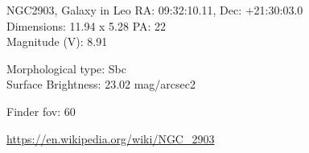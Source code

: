 \begin{block}{NGC2903, Galaxy in Leo}
    RA: 09:32:10.11, Dec: +21:30:03.0 \\ 
    Dimensions: 11.94 x 5.28 PA: 22 \\ 
    Magnitude (V): 8.91

    Morphological type: Sbc \\ 
    Surface Brightness: 23.02 mag/arcsec2 


    Finder fov: 60 

    \url{https://en.wikipedia.org/wiki/NGC_2903} 
\end{block}